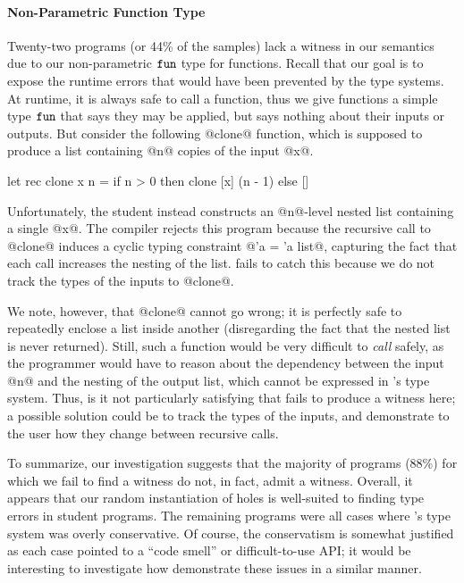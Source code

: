 \paragraph{Non-Parametric Function Type}
%
Twenty-two programs (or 44\% of the samples) lack a witness in our
semantics due to our non-parametric $\mathtt{fun}$ type for functions.
%
Recall that our goal is to expose the runtime errors that would have
been prevented by the type systems.
%
At runtime, it is always safe to call a function, thus we give functions
a simple type $\mathtt{fun}$ that says they may be applied, but says nothing
about their inputs or outputs.
%
But consider the following @clone@ function, which is supposed to
produce a list containing @n@ copies of the input @x@.
%
%
\begin{code}
  let rec clone x n =
    if n > 0 then
      clone [x] (n - 1)
    else
      []
\end{code}
%
Unfortunately, the student instead constructs an @n@-level nested list
containing a single @x@.
%
The \ocaml compiler rejects this program because the recursive call to
@clone@ induces a cyclic typing constraint @'a = 'a list@, capturing the
fact that each call increases the nesting of the list.
%
\toolname fails to catch this because we do not track the types of the
inputs to @clone@.

We note, however, that @clone@ cannot go wrong; it is perfectly safe to
repeatedly enclose a list inside another (disregarding the fact that the
nested list is never returned).
%
Still, such a function would be very difficult to \emph{call} safely, as
the programmer would have to reason about the dependency between the
input @n@ and the nesting of the output list, which cannot be expressed
in \ocaml's type system.
%
Thus, is it not particularly satisfying that \toolname fails to produce
a witness here; a possible solution could be to track the types of the
inputs, and demonstrate to the user how they change between recursive
calls.


To summarize, our investigation suggests that the majority of programs
(88\%) for which we fail to find a witness do not, in fact, admit a
witness.
%
Overall, it appears that our random instantiation of holes is well-suited
to finding type errors in student programs.
%
The remaining programs were all cases where \ocaml's type system was
overly conservative.
%
Of course, the conservatism is somewhat justified as each case pointed
to a ``code smell'' or difficult-to-use API; it would be interesting to
investigate how demonstrate these issues in a similar manner.

